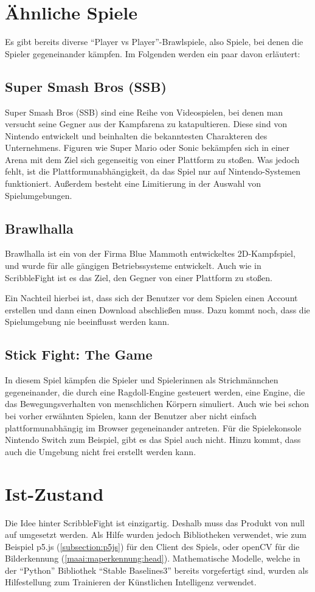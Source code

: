 \section{Ähnliche Spiele}
Es gibt bereits diverse ``Player vs Player''-Brawlspiele, also Spiele, bei denen die Spieler gegeneinander kämpfen. Im Folgenden werden ein paar davon erläutert:

\subsection{Super Smash Bros (SSB)}
Super Smash Bros (SSB) sind eine Reihe von Videospielen, bei denen man versucht seine Gegner aus der Kampfarena zu katapultieren.
Diese sind von Nintendo entwickelt und beinhalten die bekanntesten Charakteren des Unternehmens.
Figuren wie Super Mario oder Sonic bekämpfen sich in einer Arena mit dem Ziel sich gegenseitig
von einer Plattform zu stoßen.
Was jedoch fehlt, ist die Plattformunabhängigkeit, da das Spiel nur auf Nintendo-Systemen funktioniert.
Außerdem besteht eine Limitierung in der Auswahl von Spielumgebungen.

\subsection{Brawlhalla} \cite{brawlhalla}
Brawlhalla ist ein von der Firma Blue Mammoth entwickeltes 2D-Kampfspiel, und wurde für alle gängigen Betriebssysteme entwickelt.
Auch wie in ScribbleFight ist es das Ziel, den Gegner von einer Plattform zu stoßen.

Ein Nachteil hierbei ist, dass sich der Benutzer vor dem Spielen einen Account erstellen
und dann einen Download abschließen muss. Dazu kommt noch, dass die Spielumgebung nie beeinflusst werden kann.

\subsection{Stick Fight: The Game} \cite{stickfight}
In diesem Spiel kämpfen die Spieler und Spielerinnen als Strichmännchen gegeneinander, die durch eine Ragdoll-Engine gesteuert werden, eine Engine, die das Bewegungsverhalten von menschlichen Körpern simuliert.
Auch wie bei schon bei vorher erwähnten Spielen, kann der Benutzer aber nicht einfach plattformunabhängig im Browser gegeneinander antreten.
Für die Spielekonsole Nintendo Switch zum Beispiel, gibt es das Spiel auch nicht. Hinzu kommt, dass auch die Umgebung nicht frei erstellt werden kann.

\section{Ist-Zustand}
Die Idee hinter ScribbleFight ist einzigartig. Deshalb muss das Produkt von null auf umgesetzt werden. Als Hilfe wurden jedoch Bibliotheken verwendet, wie zum Beispiel p5.js (\ref{subsection:p5js}) für den Client des Spiels, oder openCV für die Bilderkennung (\ref{maai:maperkennung:head}).
Mathematische Modelle, welche in der ``Python'' Bibliothek ``Stable Baselines3'' bereits vorgefertigt sind, wurden
als Hilfestellung zum Trainieren der Künstlichen Intelligenz verwendet.